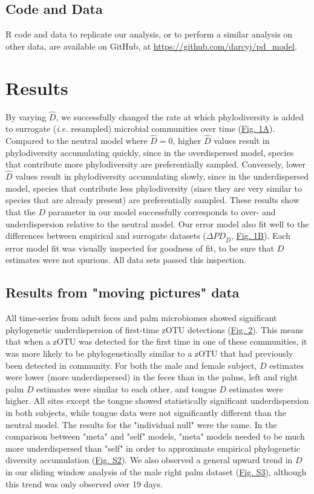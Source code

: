 \documentclass{article}
\begin{document}
\subsection{Code and Data} \label{sec:codeAndData}
R code and data to replicate our analysis, or to perform a similar analysis on other data, are available on GitHub, at \url{https://github.com/darcyj/pd_model}. 


\section{Results} \label{sec:results}
By varying \(\hat{D}\), we successfully changed the rate at which phylodiversity is added to surrogate (\emph{i.e.} resampled) microbial communities over time (\hyperref[sec:figure1]{Fig. 1A}). Compared to the neutral model where \(\hat{D} = 0\), higher \(\hat{D}\) values result in phylodiversity accumulating quickly, since in the overdispersed model, species that contribute more phylodiversity are preferentially sampled. Conversely, lower \(\hat{D}\) values result in phylodiversity accumulating slowly, since in the underdispersed model, species that contribute less phylodiversity (since they are very similar to species that are already present) are preferentially sampled. These results show that the \(D\) parameter in our model successfully corresponds to over- and underdispersion relative to the neutral model. Our error model also fit well to the differences between empirical and surrogate datasets (\(\Delta PD_{\hat{D}}\), \hyperref[sec:figure1]{Fig. 1B}). Each error model fit was visually inspected for goodness of fit, to be sure that \(D\) estimates were not spurious. All data sets passed this inspection.

\subsection{Results from "moving pictures" data}
All time-series from adult feces and palm microbiomes \cite{Caporaso2011} showed significant phylogenetic underdispersion of first-time zOTU detections (\hyperref[sec:figure2]{Fig. 2}). This means that when a zOTU was detected for the first time in one of these communities, it was more likely to be phylogenetically similar to a zOTU that had previously been detected in community. For both the male and female subject, \(D\) estimates were lower (more underdispersed) in the feces than in the palms, left and right palm \(D\) estimates were similar to each other, and tongue \(D\) estimates were higher. All sites except the tongue showed statistically significant underdispersion in both subjects, while tongue data were not significantly different than the neutral model. The results for the "individual null" were the same. In the comparison between "meta" and "self" models, "meta" models needed to be much more underdispersed than "self" in order to approximate empirical phylogenetic diversity accumulation (\hyperref[sec:figureS2]{Fig. S2}). We also observed a general upward trend in \(D\) in our sliding window analysis of the male right palm dataset (\hyperref[sec:figureS3]{Fig. S3}), although this trend was only observed over 19 days.
\end{document}
